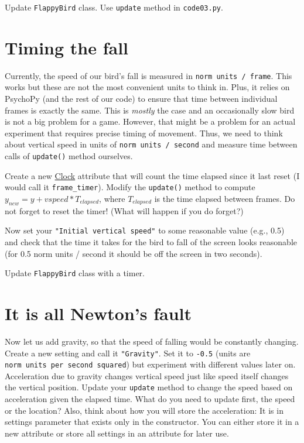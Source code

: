 \documentclass[
]{book}
\begin{document}
Update \texttt{FlappyBird} class.
Use \texttt{update} method in \texttt{code03.py}.

\hypertarget{timing-the-fall}{%
\section{Timing the fall}\label{timing-the-fall}}

Currently, the speed of our bird's fall is measured in \texttt{norm\ units\ /\ frame}. This works but these are not the most convenient units to think in. Plus, it relies on PsychoPy (and the rest of our code) to ensure that time between individual frames is exactly the same. This is \emph{mostly} the case and an occasionally slow bird is not a big problem for a game. However, that might be a problem for an actual experiment that requires precise timing of movement. Thus, we need to think about vertical speed in units of \texttt{norm\ units\ /\ second} and measure time between calls of \texttt{update()} method ourselves.

Create a new \href{https://psychopy.org/api/clock.html\#psychopy.clock.Clock}{Clock} attribute that will count the time elapsed since it last reset (I would call it \texttt{frame\_timer}). Modify the \texttt{update()} method to compute \(y_{new} = y + vspeed * T_{elapsed}\), where \(T_{elapsed}\) is the time elapsed between frames. Do not forget to reset the timer! (What will happen if you do forget?)

Now set your \texttt{"Initial\ vertical\ speed"} to some reasonable value (e.g., 0.5) and check that the time it takes for the bird to fall of the screen looks reasonable (for 0.5 norm units / second it should be off the screen in two seconds).

Update \texttt{FlappyBird} class with a timer.

\hypertarget{it-is-all-newtons-fault}{%
\section{It is all Newton's fault}\label{it-is-all-newtons-fault}}

Now let us add gravity, so that the speed of falling would be constantly changing. Create a new setting and call it \texttt{"Gravity"}. Set it to \texttt{-0.5} (units are \texttt{norm\ units\ per\ second\ squared}) but experiment with different values later on. Acceleration due to gravity changes vertical speed just like speed itself changes the vertical position. Update your \texttt{update} method to change the speed based on acceleration given the elapsed time. What do you need to update first, the speed or the location? Also, think about how you will store the acceleration: It is in settings parameter that exists only in the constructor. You can either store it in a new attribute or store all settings in an attribute for later use.
\end{document}
